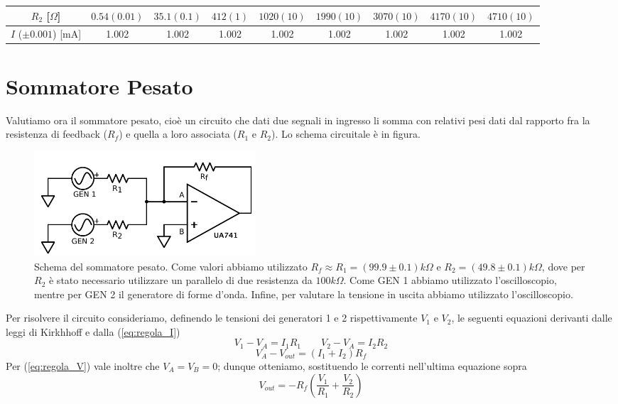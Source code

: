 \begin{center}
\begin{tabular}{c|c|c|c|c|c|c|c|c}
$R_2$ [$\Omega$] & $0.54(0.01)$ & $35.1(0.1)$ & $412(1)$ & $1020(10)$ & $1990(10)$ & $3070(10)$ & $4170(10)$ & $4710(10)$ \\ 
\hline 
$I$ ($\pm 0.001$) [$\si{\milli\ampere}$] & 1.002 & 1.002 & 1.002 & 1.002 & 1.002 & 1.002 & 1.002 & 1.002 \\ 
\end{tabular}
\end{center}

\section{Sommatore Pesato}

Valutiamo ora il sommatore pesato, cioè un circuito che dati due segnali in ingresso li somma con relativi pesi dati dal rapporto fra la resistenza di feedback ($R_f$) e quella a loro associata ($R_1$ e $R_2$). Lo schema circuitale è in figura.

\begin{figure}
  \begin{center}
    \includegraphics[width=0.40\textwidth]{../E01/latex/c2.pdf}
  \end{center}
  \caption{Schema del sommatore pesato. Come valori abbiamo utilizzato $R_f \approx R_1=(99.9 \pm 0.1) k \Omega$ e $R_2=(49.8 \pm 0.1) k \Omega$, dove per $R_2$ è stato necessario utilizzare un parallelo di due resistenza da $100 k\Omega$. Come GEN 1 abbiamo utilizzato l'oscilloscopio, mentre per GEN 2 il generatore di forme d'onda. Infine, per valutare la tensione in uscita abbiamo utilizzato l'oscilloscopio.}
\end{figure}

Per risolvere il circuito consideriamo, definendo le tensioni dei generatori 1 e 2 rispettivamente $V_1$ e $V_2$, le seguenti equazioni derivanti dalle leggi di Kirkhhoff e dalla (\ref{eq:regola_I})
$$V_1 - V_A =I_1 R_1 \qquad V_2 - V_A =I_2 R_2$$
$$V_A - V_{out} =(I_1+I_2) R_f$$
Per (\ref{eq:regola_V}) vale inoltre che $V_A=V_B=0$; dunque otteniamo, sostituendo le correnti nell'ultima equazione sopra
$$V_{out}=-R_f \left( \frac{V_1}{R_1}+\frac{V_2}{R_2}\right)$$

